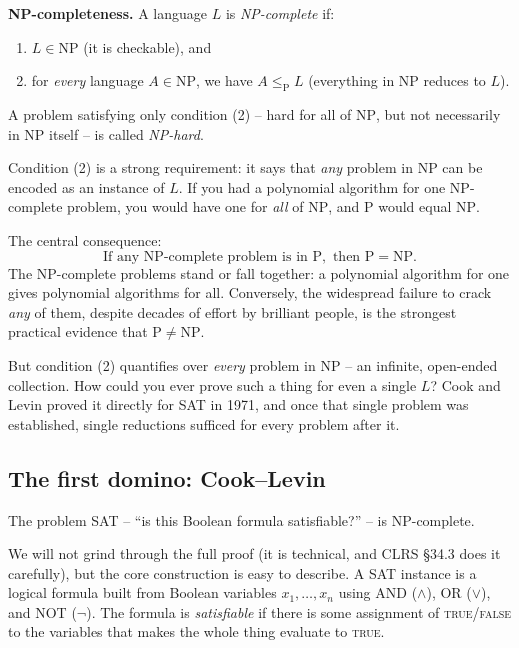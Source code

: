\begin{formalbox}
\textbf{NP-completeness.} A language $L$ is \emph{NP-complete} if:
\begin{enumerate}
  \item $L \in \mathrm{NP}$ (it is checkable), and
  \item for \emph{every} language $A \in \mathrm{NP}$, we have $A
        \le_{\mathrm{P}} L$ (everything in $\mathrm{NP}$ reduces to $L$).
\end{enumerate}
A problem satisfying only condition (2) -- hard for all of $\mathrm{NP}$, but not
necessarily in $\mathrm{NP}$ itself -- is called \emph{NP-hard}.
\end{formalbox}

Condition (2) is a strong requirement: it says that \emph{any} problem in
$\mathrm{NP}$ can be encoded as an instance of $L$. If you had a polynomial algorithm for one NP-complete problem, you would
have one for \emph{all} of $\mathrm{NP}$, and $\mathrm{P}$ would equal
$\mathrm{NP}$.

\begin{focusbox}
The central consequence:
\[
  \text{If any NP-complete problem is in } \mathrm{P},
  \text{ then } \mathrm{P}=\mathrm{NP}.
\]
The NP-complete problems stand or fall together: a polynomial algorithm for one
gives polynomial algorithms for all. Conversely, the widespread failure to crack \emph{any} of them, despite decades of
effort by brilliant people, is the strongest practical evidence that
$\mathrm{P}\ne\mathrm{NP}$.
\end{focusbox}

But condition (2) quantifies over \emph{every} problem in $\mathrm{NP}$ -- an
infinite, open-ended collection. How could you ever prove such a thing for even a
single $L$? Cook and Levin proved it directly for \textsc{SAT}
in 1971, and once that single problem was established, single reductions sufficed
for every problem after it.

\subsection{The first domino: Cook--Levin}

\begin{theorem}
\label{ch33:cook-levin}
The problem \textsc{SAT} -- ``is this Boolean formula satisfiable?'' -- is
NP-complete.
\end{theorem}

We will not grind through the full proof (it is technical, and CLRS \S34.3 does it
carefully), but the core construction is easy to describe. A
\textsc{SAT} instance is a logical formula built from Boolean variables
$x_1,\dots,x_n$ using AND ($\wedge$), OR ($\vee$), and NOT ($\neg$). The formula
is \emph{satisfiable} if there is some assignment of \textsc{true}/\textsc{false}
to the variables that makes the whole thing evaluate to \textsc{true}.

